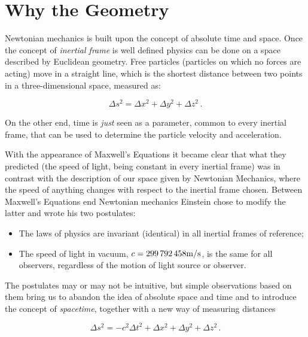 \section{Why the \Sh{} Geometry}

Newtonian mechanics is built upon the concept of absolute time and space.
Once the concept of \textit{inertial frame} is well defined physics can be done on a space described by Euclidean geometry.
Free particles (particles on which no forces are acting) move in a straight line, which is the shortest distance between two points in a three-dimensional space, measured as:

\begin{equation}
    \Delta s^2 = \Delta x^2 + \Delta y^2 + \Delta z^2 \, .
    \label{eq:euclide}
\end{equation}

On the other end, time is \textit{just} seen as a parameter, common to every inertial frame,
that can be used to determine the particle velocity and acceleration.

With the appearance of Maxwell's Equations it became clear that what they predicted (the speed of light,
being constant in every inertial frame) was in contrast with the description of our space given by Newtonian Mechanics,
where the speed of anything changes with respect to the inertial frame chosen.
Between Maxwell's Equations end Newtonian mechanics Einstein chose to modify the latter and wrote his two postulates:

\begin{itemize}
    \item The laws of physics are invariant (identical) in all inertial frames of reference;
    \item The speed of light in vacuum, $c = \num{299792458} \unit[per-mode = symbol]{\meter\per\second}$, is the same for all observers, regardless of the motion of light source or observer.
\end{itemize}

The postulates may or may not be intuitive, but simple observations based on them bring us to abandon the idea
of absolute space and time and to introduce the concept of \textit{spacetime},
together with a new way of measuring distances

\begin{equation}
    \Delta s^2 = - c^2 \Delta t^2 + \Delta x^2 + \Delta y^2 + \Delta z^2 \, .
    \label{eq:Minkowski}
\end{equation}

